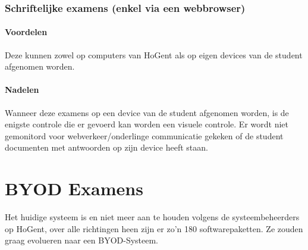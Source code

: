 \subsubsection{Schriftelijke examens (enkel via een webbrowser)}

\paragraph{Voordelen}
Deze kunnen zowel op computers van HoGent als op eigen devices van de student afgenomen worden. 

\paragraph{Nadelen}
Wanneer deze examens op een device van de student afgenomen worden, is de enigste controle die er gevoerd kan worden een visuele controle. Er wordt niet gemonitord voor webverkeer/onderlinge communicatie gekeken of de student documenten met antwoorden op zijn device heeft staan. 


\section{BYOD Examens}

Het huidige systeem is   en niet meer aan te houden volgens de systeembeheerders op HoGent, over alle richtingen heen zijn er zo'n 180 softwarepaketten. Ze zouden graag evolueren naar een BYOD-Systeem.





